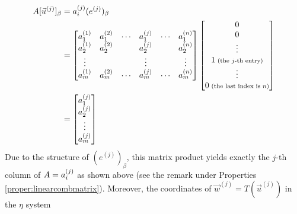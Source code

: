 \begin{align*}
A[\vec{u}^{(j)}]_\beta &= a_i^{(j)}(e^{(j)})_\beta \\
&=
\begin{bmatrix}
a_1^{(1)} & a_1^{(2)} & \cdots & a_1^{(j)} & \cdots & a_1^{(n)} \\
a_2^{(1)} & a_2^{(2)} & & a_2^{(j)} & & a_2^{(n)} \\
\vdots & & & \vdots & & \vdots \\
a_m^{(1)} & a_m^{(2)} & \cdots & a_m^{(j)} & \cdots & a_m^{(n)}
\end{bmatrix}
\begin{bmatrix}
0 \\
0 \\
\vdots \\
1 {\scriptsize \text{ (the $j$-th entry)}} \\
\vdots \\
0 {\scriptsize \text{ (the last index is $n$)}}
\end{bmatrix} \\
&=
\begin{bmatrix}
a_1^{(j)} \\
a_2^{(j)} \\
\vdots \\
a_m^{(j)}
\end{bmatrix}
\end{align*}
Due to the structure of $(e^{(j)})_\beta$, this matrix product yields exactly the $j$-th column of $A = \smash{a_i^{(j)}}$ as shown above (see the remark under Properties \ref{proper:linearcombmatrix}). Moreover, the coordinates of $\vec{w}^{(j)} = T(\vec{u}^{(j)})$ in the $\mathcal{\eta}$ system
